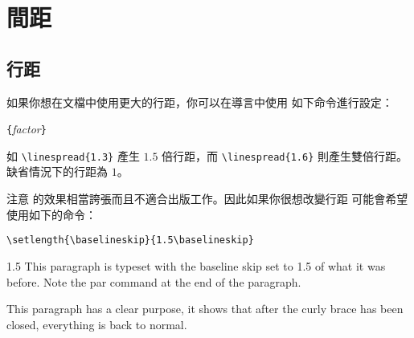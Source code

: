 \section{間距}

\subsection{行距}
%
如果你想在文檔中使用更大的行距，你可以在導言中使用
如下命令進行設定：
\begin{lscommand}
\verb|{|\emph{factor}\verb|}|
\end{lscommand}
如 \verb|\linespread{1.3}| 產生 $1.5$ 倍行距，而 \verb|\linespread{1.6}| 
則產生雙倍行距。缺省情況下的行距為 $1$。 

注意  的效果相當誇張而且不適合出版工作。因此如果你很想改變行距
可能會希望使用如下的命令：
\begin{lscommand}
\verb|\setlength{\baselineskip}{1.5\baselineskip}|
\end{lscommand}

\begin{example}
{\setlength{\baselineskip}%
           {1.5\baselineskip}
This paragraph is typeset with
the baseline skip set to 1.5 of
what it was before. Note the par
command at the end of the
paragraph.\par}

This paragraph has a clear
purpose, it shows that after the
curly brace has been closed,
everything is back to normal.
\end{example}

